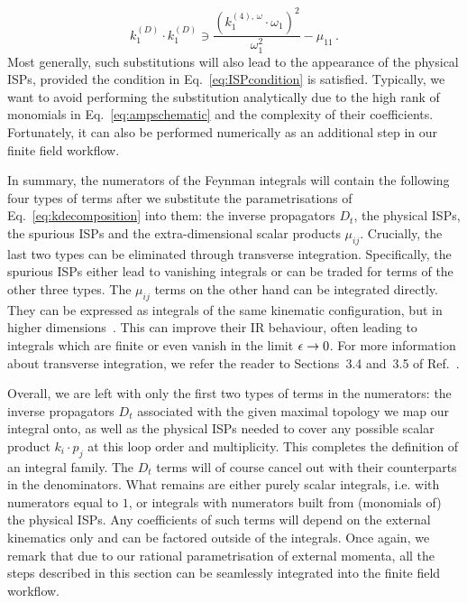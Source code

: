 \documentclass[main.tex]{subfiles}
\begin{document}
\begin{equation}
    k_1^{(D)} \cdot k_1^{(D)} \ni \frac{(k_1^{(4),\, \omega} \cdot \omega_1)^2}{\omega_1^2} - \mu_{11}\,.
\end{equation}
Most generally, such substitutions will also lead to the appearance of the physical ISPs, provided the condition in Eq.~\ref{eq:ISPcondition} is satisfied. Typically, we want to avoid performing the substitution analytically due to the high rank of monomials in Eq.~\ref{eq:ampschematic} and the complexity of their coefficients. Fortunately, it can also be performed numerically as an additional step in our finite field workflow.

In summary, the numerators of the Feynman integrals will contain the following four types of terms after we substitute the parametrisations of Eq.~\ref{eq:kdecomposition} into them: the inverse propagators $D_t$, the physical ISPs, the spurious ISPs and the extra-dimensional scalar products $\mu_{ij}$. Crucially, the last two types can be eliminated through transverse integration. Specifically, the spurious ISPs either lead to vanishing integrals or can be traded for terms of the other three types. The $\mu_{ij}$ terms on the other hand can be integrated directly. They can be expressed as integrals of the same kinematic configuration, but in higher dimensions~\cite{Bern:1995db}. This can improve their IR behaviour, often leading to integrals which are finite or even vanish in the limit $\epsilon \to 0$. For more information about transverse integration, we refer the reader to Sections~3.4 and~3.5 of Ref.~\cite{Badger:2023eqz}.

Overall, we are left with only the first two types of terms in the numerators: the inverse propagators $D_t$ associated with the given maximal topology we map our integral onto, as well as the physical ISPs needed to cover any possible scalar product $k_i \cdot p_j$ at this loop order and multiplicity. This completes the definition of an integral family. The $D_t$ terms will of course cancel out with their counterparts in the denominators. What remains are either purely scalar integrals, i.e. with numerators equal to $1$, or integrals with numerators built from (monomials of) the physical ISPs. Any coefficients of such terms will depend on the external kinematics only and can be factored outside of the integrals. Once again, we remark that due to our rational parametrisation of external momenta, all the steps described in this section can be seamlessly integrated into the finite field workflow.
\end{document}
